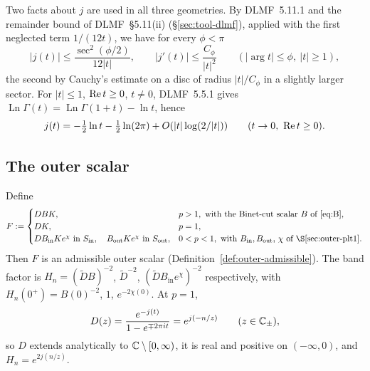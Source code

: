 Two facts about $j$ are used in all three geometries. By DLMF~5.11.1 and the remainder bound of DLMF~\S5.11(ii)
(\S\ref{sec:tool-dlmf}), applied with the first neglected term $1/(12t)$, we have for every $\phi<\pi$
\begin{equation}\label{eq:binet-bound}
  |j(t)|\le\frac{\sec^2(\phi/2)}{12|t|},\qquad |j'(t)|\le\frac{C_\phi}{|t|^2}\qquad(|\arg t|\le\phi,\ |t|\ge1),
\end{equation}
the second by Cauchy's estimate on a disc of radius $|t|/C_\phi$ in a slightly larger sector. For $|t|\le1$,
$\operatorname{Re} t\ge0$, $t\ne0$, DLMF~5.5.1 gives $\operatorname{Ln}\Gamma(t)=\operatorname{Ln}\Gamma(1+t)-\ln t$, hence
\begin{equation}\label{eq:binet-small}
  j(t)=-\tfrac12\ln t-\tfrac12\ln(2\pi)+O(|t|\log(2/|t|))\qquad(t\to0,\ \re t\ge0).
\end{equation}

\subsection{The outer scalar}\label{sec:outer-scalar}

\begin{lemma}\label{lem:outer}
Define
\[
  F:=\begin{cases}DBK,&p>1,\ \text{with the Binet-cut scalar $B$ of~\eqref{eq:B}},\\
  DK,&p=1,\\
  DB_{\mathrm{in}}Ke^{\chi}\ \text{in }\Sin,\quad B_{\mathrm{out}}Ke^{\chi}\ \text{in }\Sout,&0<p<1,\ \text{with $B_{\mathrm{in}},B_{\mathrm{out}}$, $\chi$ of \S\ref{sec:outer-plt1}}.
  \end{cases}
\]
Then $F$ is an admissible outer scalar (Definition~\ref{def:outer-admissible}). The band factor is
$H_n=(\tilde DB)^{-2}$, $\tilde D^{-2}$, $(\tilde DB_{\mathrm{in}}e^{\chi})^{-2}$ respectively, with
$H_n(0^+)=B(0)^{-2}$, $1$, $e^{-2\chi(0)}$. At $p=1$,
\begin{equation}\label{eq:reflection}
  D(z)=\frac{e^{-j(t)}}{1-e^{\mp2\pi it}}=e^{j(-n/z)}\qquad(z\in\mathbb{C}_\pm),
\end{equation}
so $D$ extends analytically to $\mathbb{C}\setminus[0,\infty)$, it is real and positive on $(-\infty,0)$, and $H_n=e^{2j(n/z)}$.
\end{lemma}

